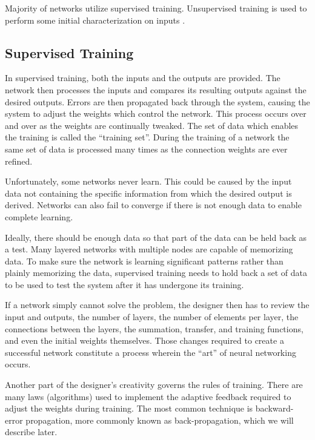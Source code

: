 Majority of networks utilize supervised training. Unsupervised training is used to perform some initial characterization on inputs \cite{mostcommon}.

\vspace{10pt}

\subsection*{Supervised Training}

In supervised training, both the inputs and the outputs are provided. The network then processes the inputs and compares its resulting outputs against the desired outputs. Errors are then propagated back through the system, causing the system to adjust the weights which control the network. This process occurs over and over as the weights are continually tweaked. The set of data which enables the training is called the ``training set''. During the training of a network the same set of data is processed many times as the connection weights are ever refined.

Unfortunately, some networks never learn. This could be caused by the input data not containing the specific information from which the desired output is derived. Networks can also fail to converge if there is not enough data to enable complete learning. 

Ideally, there should be enough data so that part of the data can be held back as a test. Many layered networks with multiple nodes are capable of memorizing data. To make sure the network is learning significant patterns rather than plainly memorizing the data, supervised training needs to hold back a set of data to be used to test the system after it has undergone its training.

If a network simply cannot solve the problem, the designer then has to review the input and outputs, the number of layers, the number of elements per layer, the connections between the layers, the summation, transfer, and training functions, and even the initial weights themselves. Those changes required to create a successful network constitute a process wherein the ``art'' of neural networking occurs.

Another part of the designer's creativity governs the rules of training. There are many laws (algorithms) used to implement the adaptive feedback required to adjust the weights during training. The most common technique is backward-error propagation, more commonly known as back-propagation, which we will describe later.

